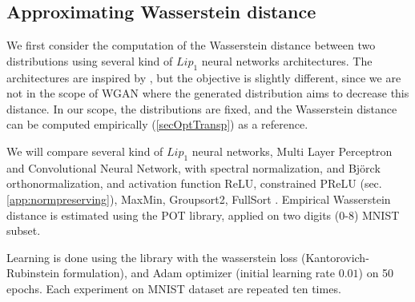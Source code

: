 \subsection{Approximating Wasserstein distance}
\label{sec:approx_wass_dist}
We first consider the computation of the Wasserstein distance between two distributions using several kind of $Lip_1$ neural networks architectures. The architectures are inspired by \cite{pmlr-v97-anil19a}, but the objective is slightly different, since we are not in the scope of WGAN where the generated distribution aims to decrease this distance. In our scope, the distributions are fixed, and the Wasserstein distance can be computed empirically (\ref{secOptTransp}) as a reference. 

We will compare several kind of $Lip_1$ neural networks, Multi Layer Perceptron and Convolutional Neural Network, with spectral normalization, and Bj\"orck orthonormalization\cite{bjorck71Ortho,pmlr-v97-anil19a}, and activation function ReLU, constrained PReLU (sec. \ref{app:normpreserving}), MaxMin, Groupsort2, FullSort \cite{pmlr-v97-anil19a}. 
Empirical Wasserstein distance is estimated using the POT library\cite{flamary2017pot}, applied on two digits (0-8) MNIST subset\cite{Lecun98}.

Learning is done using the \Deellip library with the wasserstein loss (Kantorovich-Rubinstein formulation), and Adam optimizer (initial learning rate $0.01$) on 50 epochs. Each experiment on MNIST dataset are repeated ten times. 

